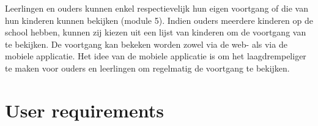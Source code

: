 \documentclass[a4paper]{article}
\begin{document}
Leerlingen en ouders kunnen enkel respectievelijk hun eigen voortgang of die van hun kinderen kunnen bekijken (module 5). Indien ouders meerdere kinderen op de school hebben, kunnen zij kiezen uit een lijst van kinderen om de voortgang van te bekijken. De voortgang kan bekeken worden zowel via de web- als via de mobiele applicatie. Het idee van de mobiele applicatie is om het laagdrempeliger te maken voor ouders en leerlingen om regelmatig de voortgang te bekijken.



\newpage
\section{User requirements}  \label{sec:user_req}%

\end{document}
